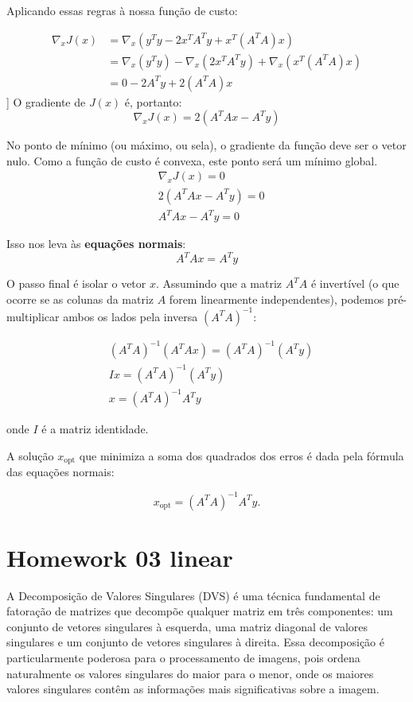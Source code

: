 Aplicando essas regras à nossa função de custo:

\begin{align*}
	\nabla_x J(x) &= \nabla_x (y^T y - 2x^T A^T y + x^T (A^T A) x) \\
	&= \nabla_x(y^T y) - \nabla_x(2x^T A^T y) + \nabla_x(x^T (A^T A) x) \\
	&= 0 - 2A^T y + 2(A^T A)x
\end{align*}
]
O gradiente de $J(x)$ é, portanto:
$$
\nabla_x J(x) = 2(A^T Ax - A^T y)
$$

No ponto de mínimo (ou máximo, ou sela), o gradiente da função deve ser o vetor nulo. Como a função de custo é convexa, este ponto será um mínimo global.
\begin{align*}
	& \nabla_x J(x) = 0 \\
	& 2(A^T Ax - A^T y) = 0 \\
	& A^T Ax - A^T y = 0
\end{align*}

Isso nos leva às \textbf{equações normais}:
$$
A^T Ax = A^T y
$$

O passo final é isolar o vetor $x$. Assumindo que a matriz $A^T A$ é invertível (o que ocorre se as colunas da matriz $A$ forem linearmente independentes), podemos pré-multiplicar ambos os lados pela inversa $(A^T A)^{-1}$:

\begin{align*}
	& (A^T A)^{-1} (A^T Ax) = (A^T A)^{-1} (A^T y) \\
	& I x = (A^T A)^{-1} (A^T y) \\
	& x = (A^T A)^{-1} A^T y
\end{align*}

onde $I$ é a matriz identidade.

A solução $x_{\text{opt}}$ que minimiza a soma dos quadrados dos erros é dada pela fórmula das equações normais:

$$
x_{\text{opt}} = (A^T A)^{-1} A^T y.
$$

\section{Homework 03 linear}

A Decomposição de Valores Singulares (DVS) é uma técnica fundamental de fatoração de matrizes que decompõe qualquer matriz em três componentes: um conjunto de vetores singulares à esquerda, uma matriz diagonal de valores singulares e um conjunto de vetores singulares à direita. Essa decomposição é particularmente poderosa para o processamento de imagens, pois ordena naturalmente os valores singulares do maior para o menor, onde os maiores valores singulares contêm as informações mais significativas sobre a imagem.

